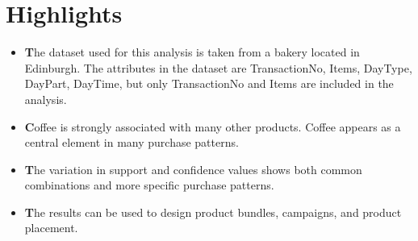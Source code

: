 \chapter*{Highlights}
\label{chap:highlights}
\begin{itemize}
    \item \textbf The dataset used for this analysis is taken from a bakery located in Edinburgh. The attributes in the dataset are TransactionNo, Items, DayType, DayPart, DayTime, but only TransactionNo and Items are included in the analysis.   
    \item \textbf Coffee is strongly associated with many other products. Coffee appears as a central element in many purchase patterns. 
    \item \textbf The variation in support and confidence values shows both common combinations and more specific purchase patterns.  
    \item \textbf The results can be used to design product bundles, campaigns, and product placement.
\end{itemize}

\thispagestyle{empty}
\addtocounter{page}{-1}